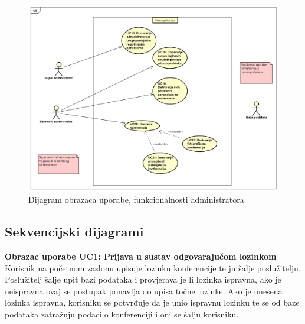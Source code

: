 					\begin{figure}[H]
						\includegraphics[width=\textwidth]{slike/adminUseCase.PNG} %
						\caption{Dijagram obrazaca uporabe, funkcionalnosti administratora}
						\label{fig:admin-dijagram} %
					\end{figure}

				\eject

			\subsection{Sekvencijski dijagrami}

				\textbf{Obrazac uporabe UC1: Prijava u sustav odgovarajućom lozinkom}\\
				Korisnik na početnom zaslonu upisuje lozinku konferencije te ju šalje poslužitelju. Poslužitelj šalje upit bazi podataka i provjerava je li lozinka ispravna, ako je neispravna ovaj se postupak ponavlja do upisa točne lozinke. Ako je unesena lozinka ispravna, korisniku se potvrđuje da je unio ispravnu lozinku te se od baze podataka zatražuju podaci o konferenciji i oni se šalju korisniku.

